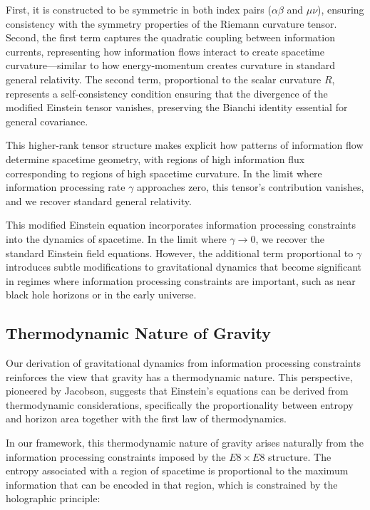 \documentclass[11pt,english,twoside]{article}
\begin{document}
First, it is constructed to be symmetric in both index pairs ($\alpha\beta$ and $\mu\nu$), ensuring consistency with the symmetry properties of the Riemann curvature tensor. Second, the first term captures the quadratic coupling between information currents, representing how information flows interact to create spacetime curvature—similar to how energy-momentum creates curvature in standard general relativity. The second term, proportional to the scalar curvature $R$, represents a self-consistency condition ensuring that the divergence of the modified Einstein tensor vanishes, preserving the Bianchi identity essential for general covariance.

This higher-rank tensor structure makes explicit how patterns of information flow determine spacetime geometry, with regions of high information flux corresponding to regions of high spacetime curvature. In the limit where information processing rate $\gamma$ approaches zero, this tensor's contribution vanishes, and we recover standard general relativity.

This modified Einstein equation incorporates information processing constraints into the dynamics of spacetime. In the limit where $\gamma \to 0$, we recover the standard Einstein field equations. However, the additional term proportional to $\gamma$ introduces subtle modifications to gravitational dynamics that become significant in regimes where information processing constraints are important, such as near black hole horizons or in the early universe.

\subsection{Thermodynamic Nature of Gravity}

Our derivation of gravitational dynamics from information processing constraints reinforces the view that gravity has a thermodynamic nature. This perspective, pioneered by Jacobson, suggests that Einstein's equations can be derived from thermodynamic considerations, specifically the proportionality between entropy and horizon area together with the first law of thermodynamics.

In our framework, this thermodynamic nature of gravity arises naturally from the information processing constraints imposed by the $E8\times E8$ structure. The entropy associated with a region of spacetime is proportional to the maximum information that can be encoded in that region, which is constrained by the holographic principle:
\end{document}
